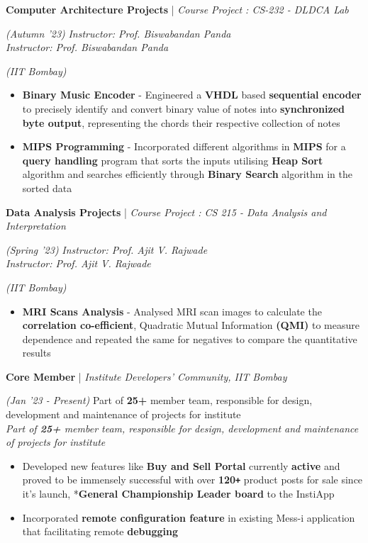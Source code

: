 \documentclass[10pt]{article}
\def\Plus{\texttt{\texttt{+}}}
\newcommand{\xfill}[2][1ex]{
	\dimen0=#2\advance\dimen0 by #1
	\leaders\hrule height \dimen0 depth -#1\hfill
}
\renewcommand{\section}[1]{
	\vspace{5pt}
	{\color{Blue}{\Large\scshape\raggedright #1\xfill[0pt]{0.5pt}}}
}
\renewcommand{\subsection}[4]{
	\def\temp{#4}
	\vspace{2pt}
	{
		\large
		{\color{Green} \textbf{#1}} | {\sl #2} \filldate{#3}
		\ifx\temp\empty
		\else
		{
			\\[0.1em]
			\fontsize{11}{13.2}\selectfont
			\sl #4
		}
		\fi
	}
}
\newcommand{\filldate}[1]{\strut\hfill {\small \textit{(#1)}}}
\begin{document}
\subsection{Computer Architecture Projects}{Course Project : CS-232 - DLDCA Lab}{Autumn '23}{\textit{Instructor: Prof. Biswabandan Panda}}\filldate{IIT Bombay}
\begin{itemize}
	\item \textbf{Binary Music Encoder} - Engineered a \textbf{VHDL }based\textbf{ sequential encoder} to precisely identify and convert binary value of notes into \textbf{synchronized byte output}, representing the chords their respective collection of notes
 	\item \textbf{MIPS Programming} - Incorporated different algorithms in \textbf{MIPS} for a \textbf{query handling} program that sorts the inputs utilising \textbf{Heap Sort} algorithm and searches efficiently through \textbf{Binary Search} algorithm in the sorted data 
  
\end{itemize}
\subsection{Data Analysis Projects}{Course Project : CS 215 - Data Analysis and Interpretation}{Spring '23}{\textit{Instructor: Prof. Ajit V. Rajwade}}\filldate{IIT Bombay}
\begin{itemize}
 	\item \textbf{MRI Scans Analysis} - Analysed MRI scan images to calculate the \textbf{correlation co-efficient}, Quadratic Mutual Information \textbf{(QMI)} to measure dependence and repeated the same for negatives to compare the quantitative results
  
\end{itemize}

\section{Positions Of Responsibilities}
\vspace{2pt}

\subsection{Core Member}{Institute Developers' Community, IIT Bombay}{Jan '23 - Present}{Part of \textbf{25+} member team, responsible for design, development and maintenance of projects for institute}
\begin{itemize}
	\item Developed new features like \textbf{Buy and Sell Portal} currently \textbf{active} and proved to be immensely successful with over \textbf{120\Plus} product posts for sale since it's launch, *\textbf{General Championship Leader board} to the InstiApp 
	\item Incorporated \textbf{remote configuration feature} in existing Mess-i application that facilitating remote \textbf{debugging}

\end{itemize}
\end{document}
